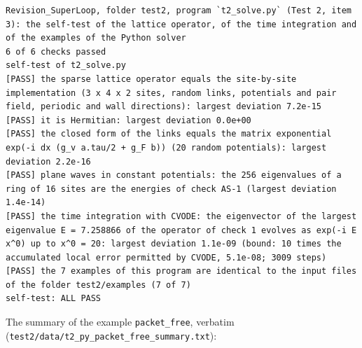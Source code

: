 \documentclass[
  10pt,
]{article}
\begin{document}
\begin{verbatim}
Revision_SuperLoop, folder test2, program `t2_solve.py` (Test 2, item 3): the self-test of the lattice operator, of the time integration and of the examples of the Python solver
6 of 6 checks passed
self-test of t2_solve.py
[PASS] the sparse lattice operator equals the site-by-site implementation (3 x 4 x 2 sites, random links, potentials and pair field, periodic and wall directions): largest deviation 7.2e-15
[PASS] it is Hermitian: largest deviation 0.0e+00
[PASS] the closed form of the links equals the matrix exponential exp(-i dx (g_v a.tau/2 + g_F b)) (20 random potentials): largest deviation 2.2e-16
[PASS] plane waves in constant potentials: the 256 eigenvalues of a ring of 16 sites are the energies of check AS-1 (largest deviation 1.4e-14)
[PASS] the time integration with CVODE: the eigenvector of the largest eigenvalue E = 7.258866 of the operator of check 1 evolves as exp(-i E x^0) up to x^0 = 20: largest deviation 1.1e-09 (bound: 10 times the accumulated local error permitted by CVODE, 5.1e-08; 3009 steps)
[PASS] the 7 examples of this program are identical to the input files of the folder test2/examples (7 of 7)
self-test: ALL PASS
\end{verbatim}

The summary of the example \texttt{packet\_free}, verbatim
(\texttt{test2/data/t2\_py\_packet\_free\_summary.txt}):
\end{document}
